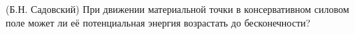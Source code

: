 (Б.Н. Садовский)
При движении материальной точки в консервативном силовом поле может ли
её потенциальная энергия возрастать до бесконечности?
